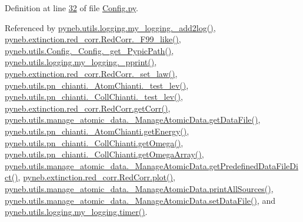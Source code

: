 Definition at line \hyperlink{_config_8py_source_l00032}{32} of file \hyperlink{_config_8py_source}{Config.\+py}.



Referenced by \hyperlink{logging_8py_source_l00059}{pyneb.\+utils.\+logging.\+my\+\_\+logging.\+\_\+add2log()}, \hyperlink{red__corr_8py_source_l00658}{pyneb.\+extinction.\+red\+\_\+corr.\+Red\+Corr.\+\_\+\+F99\+\_\+like()}, \hyperlink{_config_8py_source_l00086}{pyneb.\+utils.\+Config.\+\_\+\+Config.\+\_\+get\+\_\+\+Pypic\+Path()}, \hyperlink{logging_8py_source_l00051}{pyneb.\+utils.\+logging.\+my\+\_\+logging.\+\_\+pprint()}, \hyperlink{red__corr_8py_source_l00176}{pyneb.\+extinction.\+red\+\_\+corr.\+Red\+Corr.\+\_\+set\+\_\+law()}, \hyperlink{pn__chianti_8py_source_l00284}{pyneb.\+utils.\+pn\+\_\+chianti.\+\_\+\+Atom\+Chianti.\+\_\+test\+\_\+lev()}, \hyperlink{pn__chianti_8py_source_l00449}{pyneb.\+utils.\+pn\+\_\+chianti.\+\_\+\+Coll\+Chianti.\+\_\+test\+\_\+lev()}, \hyperlink{red__corr_8py_source_l00211}{pyneb.\+extinction.\+red\+\_\+corr.\+Red\+Corr.\+get\+Corr()}, \hyperlink{manage__atomic__data_8py_source_l00297}{pyneb.\+utils.\+manage\+\_\+atomic\+\_\+data.\+\_\+\+Manage\+Atomic\+Data.\+get\+Data\+File()}, \hyperlink{pn__chianti_8py_source_l00346}{pyneb.\+utils.\+pn\+\_\+chianti.\+\_\+\+Atom\+Chianti.\+get\+Energy()}, \hyperlink{pn__chianti_8py_source_l00484}{pyneb.\+utils.\+pn\+\_\+chianti.\+\_\+\+Coll\+Chianti.\+get\+Omega()}, \hyperlink{pn__chianti_8py_source_l00461}{pyneb.\+utils.\+pn\+\_\+chianti.\+\_\+\+Coll\+Chianti.\+get\+Omega\+Array()}, \hyperlink{manage__atomic__data_8py_source_l00034}{pyneb.\+utils.\+manage\+\_\+atomic\+\_\+data.\+\_\+\+Manage\+Atomic\+Data.\+get\+Predefined\+Data\+File\+Dict()}, \hyperlink{red__corr_8py_source_l00303}{pyneb.\+extinction.\+red\+\_\+corr.\+Red\+Corr.\+plot()}, \hyperlink{manage__atomic__data_8py_source_l00431}{pyneb.\+utils.\+manage\+\_\+atomic\+\_\+data.\+\_\+\+Manage\+Atomic\+Data.\+print\+All\+Sources()}, \hyperlink{manage__atomic__data_8py_source_l00380}{pyneb.\+utils.\+manage\+\_\+atomic\+\_\+data.\+\_\+\+Manage\+Atomic\+Data.\+set\+Data\+File()}, and \hyperlink{logging_8py_source_l00115}{pyneb.\+utils.\+logging.\+my\+\_\+logging.\+timer()}.

\hypertarget{classpyneb_1_1utils_1_1_config_1_1___config_ab6b6d2b4a7046e65edca2cf9f92be911}{}
